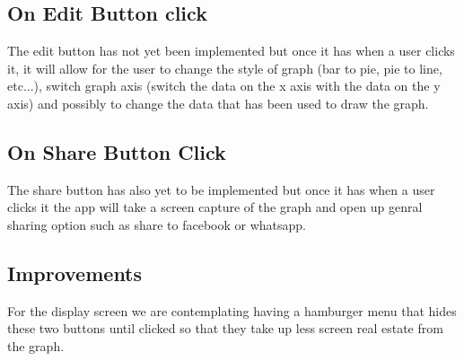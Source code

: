 \documentclass[a4paper,12pt]{article}
\begin{document}
\subsection{On Edit Button click}
The edit button has not yet been implemented but once it has when a user clicks it, it will allow for the user to change the style of graph (bar to pie, pie to line, etc...), switch graph axis (switch the data on the x axis with the data on the y axis) and possibly to change the data that has been used to draw the graph. 


\subsection{On Share Button Click}
The share button has also yet to be implemented but once it has when a user clicks it the app will take a screen capture of the graph and open up genral sharing option such as share to facebook or whatsapp.

\subsection{Improvements}
For the display screen we are contemplating having a hamburger menu that hides these two buttons until clicked so that they take up less screen real estate from the graph.
\end{document}
